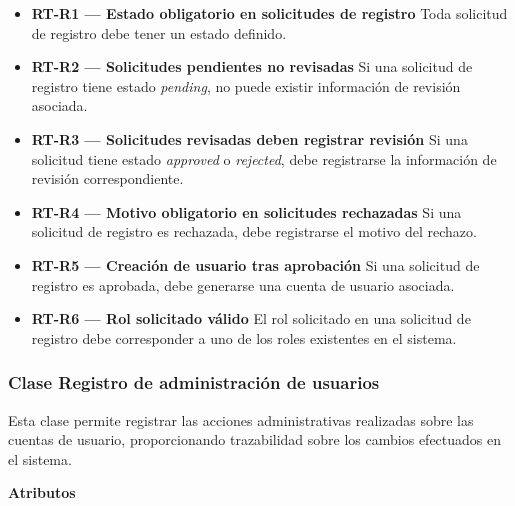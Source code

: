 \begin{itemize}

      \item \textbf{RT-R1 — Estado obligatorio en solicitudes de registro}
            Toda solicitud de registro debe tener un estado definido.
      \item \textbf{RT-R2 — Solicitudes pendientes no revisadas}
            Si una solicitud de registro tiene estado \textit{pending}, no puede existir información de revisión asociada.
      \item \textbf{RT-R3 — Solicitudes revisadas deben registrar revisión}
            Si una solicitud tiene estado \textit{approved} o \textit{rejected}, debe registrarse la información de revisión correspondiente.
      \item \textbf{RT-R4 — Motivo obligatorio en solicitudes rechazadas}
            Si una solicitud de registro es rechazada, debe registrarse el motivo del rechazo.
      \item \textbf{RT-R5 — Creación de usuario tras aprobación}
            Si una solicitud de registro es aprobada, debe generarse una cuenta de usuario asociada.
      \item \textbf{RT-R6 — Rol solicitado válido}
            El rol solicitado en una solicitud de registro debe corresponder a uno de los roles existentes en el sistema.

\end{itemize}

\subsubsection{Clase Registro de administración de usuarios}

Esta clase permite registrar las acciones administrativas realizadas sobre las cuentas de usuario, proporcionando trazabilidad sobre los cambios efectuados en el sistema.

\textbf{Atributos}

